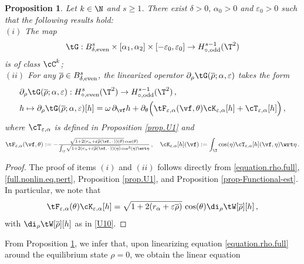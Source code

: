 \documentclass[a4paper,reqno,10pt]{article}
\newtheorem{pro}{Proposition}[section]
\newcommand{\pa}{\partial}
\begin{document}
\begin{pro}\label{lemma.constrain-Lun1}
	Let $k\in\N$ and $s\geq 1$. There exist $\delta>0,\, \alpha_{0}>0$ and  $\varepsilon_{0}>0$ such that the following results  hold:
    \\[1mm]
    \noindent $(i)$ The map
    \begin{equation}
		\tG: B_{\delta,\textnormal{even}}^{s} \times [\alpha_{1},\alpha_{2}]\times [-\varepsilon_{0},\varepsilon_{0}] \to H^{s-1}_{\circ,\textnormal{odd}}(\T^2)
	\end{equation}
	is  of class $\cC^k$;
    \\[1mm]
    \noindent $(ii)$  For any $\overline{\rho} \in B_{\delta,{\rm even}}^{s}$, the linearized operator $\partial_\rho\tG(\overline{\rho};\alpha,\varepsilon)$ takes the form
    \begin{align}
	& \partial_\rho\tG(\overline{\rho};\alpha,\varepsilon) :  H_{\circ,{\rm even}}^{s}(\T^2)\to H_{\circ,{\rm odd}}^{s-1}(\T^2)\,, \\ &h \mapsto \partial_\rho\tG(\overline{\rho};\alpha,\varepsilon)[h]=\omega\,\pa_{\vf} h + \pa_{\theta} \Big( \tF_{\varepsilon,\alpha}(\vf,\theta) \cK_{\varepsilon,\alpha}[h] + \cT_{\varepsilon,\alpha}[h] \Big)\,,
\end{align}
where $\cT_{\varepsilon,\alpha}$ is defined in Proposition \ref{prop.U1} and 
$$
		\tF_{\varepsilon,\alpha}(\vf,\theta) := - \tfrac{\sqrt{1+2(r_\alpha+\varepsilon \overline{\rho}(\vf,\,\cdot\,))(\theta)}\cos(\theta)}{\int_{\T}\sqrt{1+2(r_\alpha+\varepsilon \overline{\rho}(\vf,\,\cdot\,))(\eta)}\cos^2(\eta)\wrt\eta}  \,,\quad
		\cK_{\varepsilon,\alpha}[h](\vf)  := \int_{\T} \cos(\eta) \cT_{\varepsilon,\alpha}[h](\vf,\eta) \wrt\eta \,.
	$$
    \end{pro}
\begin{proof}
The proof of items $(i)$ and $(ii)$ follows directly from \eqref{equation.rho.full}, \eqref{full.nonlin.eq.pert}, Proposition \ref{prop.U1}, and Proposition \ref{prop-Functional-est}. In particular, we note that 
    \begin{equation}
        \tF_{\varepsilon,\alpha}(\theta) \cK_{\varepsilon,\alpha}[h] = \sqrt{1+2(r_{\alpha}+\varepsilon\overline{\rho})} \,\cos(\theta) \di_{\rho} \tW[\overline{\rho}][h] \,,
    \end{equation}
    with $\di_{\rho} \tW[\overline{\rho}][h]$ as in \eqref{U10}.
\end{proof}
From Proposition \ref{lemma.constrain-Lun1}, we infer that, upon linearizing equation \eqref{equation.rho.full} around the equilibrium state \(\rho=0\), we obtain the linear equation
\end{document}
